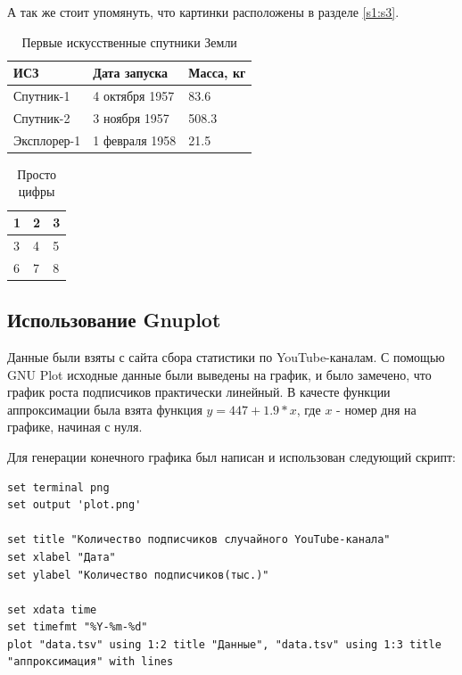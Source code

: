 \documentclass{article}
\begin{document}
А так же стоит упомянуть, что картинки расположены в разделе \ref{s1:s3}.

\begin{table}[t]
	\caption{Первые искусственные спутники Земли}
	\centering
	\begin{tabular}{ | l | l | l |}
	\hline
	ИСЗ & Дата запуска & Масса, кг      \\ \hline
	Спутник-1 & 4 октября 1957 & 83.6   \\ \hline
	Спутник-2 & 3 ноября 1957 & 508.3   \\ \hline
	Эксплорер-1 & 1 февраля 1958 & 21.5 \\
	\hline
	\end{tabular}
	\label{table:table_1}
\end{table}

\begin{table}[h]
	\caption{Просто цифры}
	\centering
	\begin{tabular}{ | l | l | l |}
	\hline
	1 & 2 & 3      \\ \hline
	3 & 4 & 5   \\ \hline
	6 & 7 & 8   \\
	\hline
	\end{tabular}
	\label{table:table_2}
\end{table}

\subsection{Использование Gnuplot} \label{s1:s6}

Данные были взяты с сайта сбора статистики по YouTube-каналам. С помощью GNU Plot исходные данные были выведены на график, и было замечено, что график роста подписчиков практически линейный. В качесте функции аппроксимации была взята функция $ y = 447 + 1.9 * x $, где $x$ - номер дня на графике, начиная с нуля.

Для генерации конечного графика был написан и использован следующий скрипт:

\begin{verbatim}
set terminal png
set output 'plot.png'

set title "Количество подписчиков случайного YouTube-канала"
set xlabel "Дата"
set ylabel "Количество подписчиков(тыс.)"

set xdata time
set timefmt "%Y-%m-%d"
plot "data.tsv" using 1:2 title "Данные", "data.tsv" using 1:3 title "аппроксимация" with lines
\end{verbatim}
\end{document}
